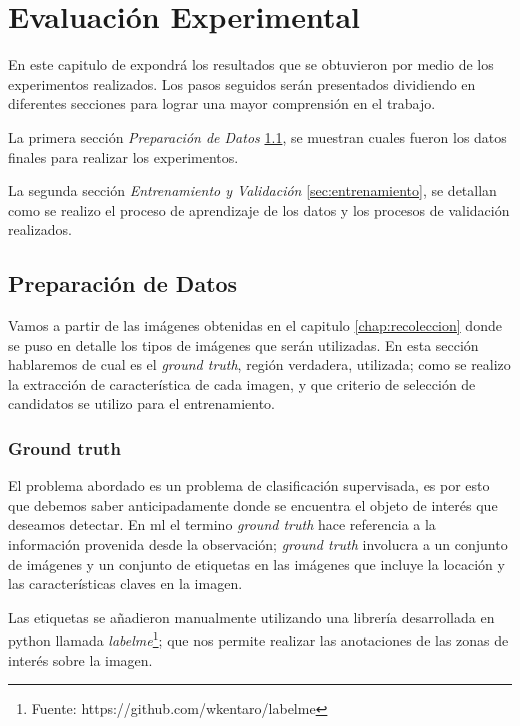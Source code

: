 \chapter{Evaluación Experimental}\label{chap:evaluacion}

En este capitulo de expondrá los resultados que se obtuvieron por medio de los experimentos realizados. Los pasos seguidos serán presentados dividiendo en diferentes secciones para lograr una mayor comprensión en el trabajo.

La primera sección \textit{Preparación de Datos} \ref{sec:preparacion_de_datos}, se muestran cuales fueron los datos finales para realizar los experimentos.

La segunda sección  \textit{Entrenamiento y Validación} \ref{sec:entrenamiento}, se detallan como se realizo el proceso de aprendizaje de los datos y los procesos de validación realizados.

\section{Preparación de Datos}\label{sec:preparacion_de_datos}

Vamos a partir de las imágenes obtenidas en el capitulo \ref{chap:recoleccion} donde se puso en detalle los tipos de imágenes que serán utilizadas. En esta sección hablaremos de cual es el \textit{ground truth}, región verdadera, utilizada; como se realizo la extracción de característica de cada imagen, y que criterio de selección de candidatos se utilizo para el entrenamiento.

\subsection{Ground truth}\label{sub:groundtruth}

El problema abordado es un problema de clasificación supervisada, es por esto que debemos saber anticipadamente donde se encuentra el objeto de interés que deseamos detectar. En \ac{ml} el termino \textit{ground truth} hace referencia a la información provenida desde la observación; \textit{ground truth} involucra a un conjunto de imágenes y un conjunto de etiquetas en las imágenes que incluye la locación y las características claves en la imagen.

Las etiquetas se añadieron manualmente utilizando una librería desarrollada en python llamada \textit{labelme}\footnote{Fuente: 
https://github.com/wkentaro/labelme}; que nos permite realizar las anotaciones de las zonas de interés sobre la imagen.

